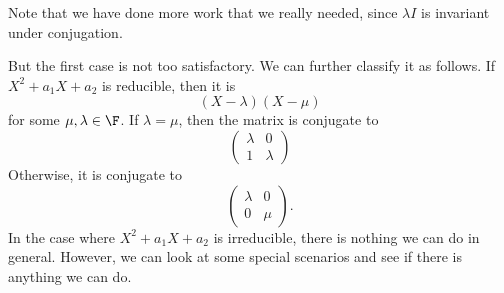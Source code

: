 \documentclass[a4paper]{article}
\begin{document}
\begin{eg}
  Note that we have done more work that we really needed, since $\lambda I$ is invariant under conjugation.

  But the first case is not too satisfactory. We can further classify it as follows. If $X^2 + a_1 X + a_2$ is reducible, then it is
  \[
    (X - \lambda)(X - \mu)
  \]
  for some $\mu, \lambda \in \F$. If $\lambda = \mu$, then the matrix is conjugate to
  \[
    \begin{pmatrix}
      \lambda & 0\\
      1 & \lambda
    \end{pmatrix}
  \]
  Otherwise, it is conjugate to
  \[
    \begin{pmatrix}
      \lambda & 0\\
      0 & \mu
    \end{pmatrix}.
  \]
  In the case where $X^2 + a_1 X + a_2$ is irreducible, there is nothing we can do in general. However, we can look at some special scenarios and see if there is anything we can do.
\end{eg}
\end{document}
